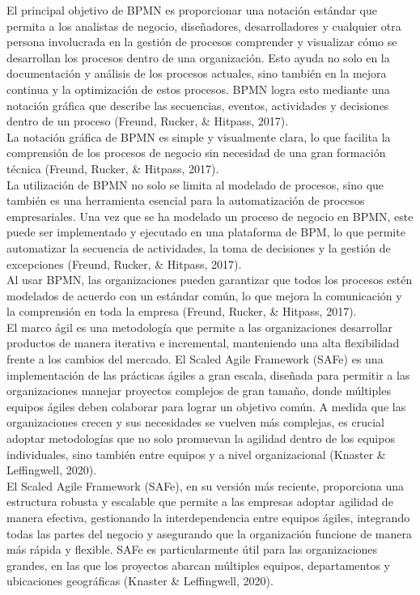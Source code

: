\documentclass[12pt,letterpaper,spanish, xcolor=table]{report}
\numberwithin{figure}{subsection}
\begin{document}
El principal objetivo de BPMN es proporcionar una notación estándar 
que permita a los analistas de negocio, diseñadores, desarrolladores y cualquier otra persona involucrada en la gestión de procesos comprender y visualizar cómo se desarrollan los procesos dentro de una organización. Esto ayuda no solo en la documentación y análisis de los procesos actuales, sino también en la mejora continua y la optimización de estos procesos. BPMN logra esto mediante una notación gráfica que describe las secuencias, eventos, actividades y decisiones dentro de un proceso (Freund, Rucker, \& Hitpass, 2017).\\

La notación gráfica de BPMN es simple y visualmente clara, lo que 
facilita la comprensión de los procesos de negocio sin necesidad de una gran formación técnica (Freund, Rucker, \& Hitpass, 2017).\\

La utilización de BPMN no solo se limita al modelado de 
procesos, sino que también es una herramienta esencial para la automatización de procesos empresariales. Una vez que se ha modelado un proceso de negocio en BPMN, este puede ser implementado y ejecutado en una plataforma de BPM, lo que permite automatizar la secuencia de actividades, la toma de decisiones y la gestión de excepciones (Freund, Rucker, \& Hitpass, 2017).\\

Al usar BPMN, las organizaciones pueden garantizar que 
todos los procesos estén modelados de acuerdo con un estándar común, lo que mejora la comunicación y la comprensión en toda la empresa (Freund, Rucker, \& Hitpass, 2017).\\

El marco ágil es una metodología que permite a las organizaciones desarrollar productos de manera iterativa e incremental, manteniendo una alta flexibilidad frente a los cambios del mercado. El Scaled Agile Framework (SAFe) es una implementación de las prácticas ágiles a gran escala, diseñada para permitir a las organizaciones manejar proyectos 
complejos de gran tamaño, donde múltiples equipos ágiles deben colaborar para lograr un objetivo común. A medida que las organizaciones crecen y sus necesidades se vuelven más complejas, es crucial adoptar metodologías que no solo promuevan la agilidad dentro de los equipos individuales, sino también entre equipos y a nivel organizacional (Knaster \& 
Leffingwell, 2020).\\

El Scaled Agile Framework (SAFe), en su versión más reciente, proporciona una estructura robusta y escalable que permite a las empresas adoptar agilidad de manera efectiva, gestionando la interdependencia entre equipos ágiles, integrando todas las partes del negocio y asegurando que la organización funcione de manera más rápida y flexible. SAFe es particularmente útil para las organizaciones grandes, en las que los proyectos abarcan múltiples equipos, departamentos y ubicaciones geográficas (Knaster \& Leffingwell, 2020).\\
\end{document}
